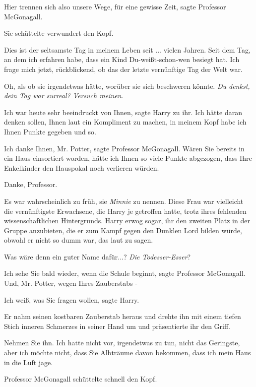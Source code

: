 \glqq{}Hier trennen sich also unsere Wege, für eine gewisse Zeit\grqq{}, sagte
Professor McGonagall.

Sie schüttelte verwundert den Kopf.

\glqq{}Dies ist der seltsamste Tag in meinem Leben seit ... vielen Jahren. Seit
dem Tag, an dem ich erfahren habe, dass ein Kind Du-weißt-schon-wen besiegt hat.
Ich frage mich jetzt, rückblickend, ob das der letzte vernünftige Tag der Welt
war.\grqq{}

Oh, als ob sie irgendetwas hätte, worüber sie sich beschweren könnte. \emph{Du
denkst, dein Tag war surreal? Versuch meinen.}

\glqq{}Ich war heute sehr beeindruckt von Ihnen\grqq{}, sagte Harry zu ihr.
\glqq Ich hätte daran denken sollen, Ihnen laut ein Kompliment zu machen, in
meinem Kopf habe ich Ihnen Punkte gegeben und so.\grqq{}

\glqq{}Ich danke Ihnen, Mr. Potter\grqq{}, sagte Professor McGonagall. \glqq{}
Wären Sie bereits in ein Haus einsortiert worden, hätte ich Ihnen so viele
Punkte abgezogen, dass Ihre Enkelkinder den Hauspokal noch verlieren
würden.\grqq{}

\glqq{}Danke, Professor.\grqq{}

Es war wahrscheinlich zu früh, sie \emph{Minnie} zu nennen. Diese Frau war
vielleicht die vernünftigste Erwachsene, die Harry je getroffen hatte, trotz
ihres fehlenden wissenschaftlichen Hintergrunds. Harry erwog sogar, ihr den
zweiten Platz in der Gruppe anzubieten, die er zum Kampf gegen den Dunklen Lord
bilden würde, obwohl er nicht so dumm war, das laut zu sagen.

Was wäre denn ein guter Name dafür...? \emph{Die Todesser-Esser}?

\glqq{}Ich sehe Sie bald wieder, wenn die Schule beginnt\grqq{}, sagte Professor
McGonagall. \glqq{}Und, Mr. Potter, wegen Ihres Zauberstabs -\grqq{}

\glqq{}Ich weiß, was Sie fragen wollen\grqq{}, sagte Harry.

Er nahm seinen kostbaren Zauberstab heraus und drehte ihn mit einem tiefen Stich
inneren Schmerzes in seiner Hand um und präsentierte ihr den Griff.

\glqq{}Nehmen Sie ihn. Ich hatte nicht vor, irgendetwas zu tun, nicht das
Geringste, aber ich möchte nicht, dass Sie Albträume davon bekommen, dass ich
mein Haus in die Luft jage.\grqq{}

Professor McGonagall schüttelte schnell den Kopf.

